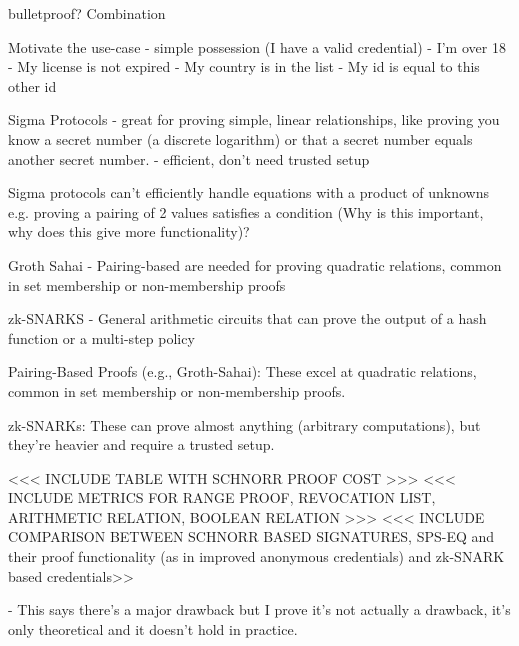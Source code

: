 bulletproof?
Combination





Motivate the use-case
- simple possession (I have a valid credential)
- I'm over 18
- My license is not expired
- My country is in the list
- My id is equal to this other id




Sigma Protocols
- great for proving simple, linear relationships, like proving you know a secret number (a discrete logarithm) or that a secret number equals another secret number.
- efficient, don't need trusted setup

Sigma protocols can't efficiently handle equations with a product of unknowns e.g. proving a pairing of 2 values satisfies a condition (Why is this important, why does this give more functionality)?


Groth Sahai
- Pairing-based are needed for proving quadratic relations, common in set membership or non-membership proofs


zk-SNARKS
- General arithmetic circuits that can prove the output of a hash function or a multi-step policy



Pairing-Based Proofs (e.g., Groth-Sahai): These excel at quadratic relations, common in set membership or non-membership proofs.

zk-SNARKs: These can prove almost anything (arbitrary computations), but they’re heavier and require a trusted setup.
























<<< INCLUDE TABLE WITH SCHNORR PROOF COST >>>
<<< INCLUDE METRICS FOR RANGE PROOF, REVOCATION LIST, ARITHMETIC RELATION, BOOLEAN RELATION >>>
<<< INCLUDE COMPARISON BETWEEN SCHNORR BASED SIGNATURES, SPS-EQ and their proof functionality (as in improved anonymous credentials) and zk-SNARK based credentials>> 


- This says there's a major drawback but I prove it's not actually a drawback, it's only theoretical and it doesn't hold in practice.

